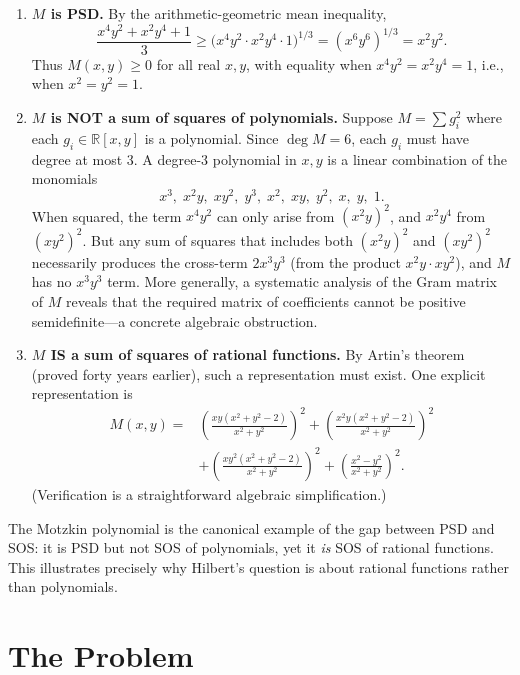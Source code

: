 \begin{enumerate}
    \item \textbf{$M$ is PSD.} By the arithmetic-geometric mean inequality,
    \[
        \frac{x^4 y^2 + x^2 y^4 + 1}{3} \geq \bigl(x^4 y^2 \cdot x^2 y^4 \cdot 1\bigr)^{1/3} = (x^6 y^6)^{1/3} = x^2 y^2.
    \]
    Thus $M(x,y) \geq 0$ for all real $x,y$, with equality when $x^4 y^2 = x^2 y^4 = 1$, i.e., when $x^2 = y^2 = 1$.

    \item \textbf{$M$ is NOT a sum of squares of polynomials.} Suppose $M = \sum g_i^2$ where each $g_i \in \mathbb{R}[x,y]$ is a polynomial. Since $\deg M = 6$, each $g_i$ must have degree at most $3$. A degree-$3$ polynomial in $x,y$ is a linear combination of the monomials
    \[
        x^3,\; x^2y,\; xy^2,\; y^3,\; x^2,\; xy,\; y^2,\; x,\; y,\; 1.
    \]
    When squared, the term $x^4 y^2$ can only arise from $(x^2 y)^2$, and $x^2 y^4$ from $(x y^2)^2$. But any sum of squares that includes both $(x^2 y)^2$ and $(x y^2)^2$ necessarily produces the cross-term $2x^3 y^3$ (from the product $x^2 y \cdot xy^2$), and $M$ has no $x^3 y^3$ term. More generally, a systematic analysis of the Gram matrix of $M$ reveals that the required matrix of coefficients cannot be positive semidefinite---a concrete algebraic obstruction.

    \item \textbf{$M$ IS a sum of squares of rational functions.} By Artin's theorem (proved forty years earlier), such a representation must exist. One explicit representation is
    \[
    \begin{aligned}
        M(x,y) ={}& \left(\frac{xy(x^2+y^2-2)}{x^2+y^2}\right)^2
                  + \left(\frac{x^2y(x^2+y^2-2)}{x^2+y^2}\right)^2 \\
                 &+ \left(\frac{xy^2(x^2+y^2-2)}{x^2+y^2}\right)^2
                  + \left(\frac{x^2-y^2}{x^2+y^2}\right)^2.
    \end{aligned}
    \]
    (Verification is a straightforward algebraic simplification.)
\end{enumerate}

The Motzkin polynomial is the canonical example of the gap between PSD and SOS: it is PSD but not SOS of polynomials, yet it \emph{is} SOS of rational functions. This illustrates precisely why Hilbert's question is about rational functions rather than polynomials.

\section{The Problem}

